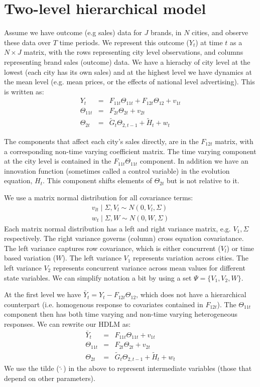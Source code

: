 \documentclass[letter,10pt]{article}
\begin{document}
\section{Two-level hierarchical model}

Assume we have outcome (e.g sales) data for $J$ brands, in $N$ cities, and observe these data
over $T$ time periods.   We represent this outcome ($Y_t$) at time $t$ as a $N\times J$ matrix, 
with the rows representing city level 
observations, and columns representing brand sales (outcome) data.  
We have a hierachy of city level at the lowest (each city has its own sales) and at the
highest level we have dynamics at the mean level (e.g. mean prices, or the effects of national level advertising).  
This is written as:
\begin{eqnarray}
Y_{t} & = & F_{11t} \Theta_{11t} + F_{12t} \Theta_{12} + v_{1t} \\
\Theta_{11t} & = & F_{2t}\Theta_{2t} + v_{2t}  \\
\Theta_{2t} & = & \tilde{G}_t \Theta_{2,t-1} + \tilde{H}_t + w_t 
\end{eqnarray}

The components that affect each city's sales directly, are in the $F_{12t}$ matrix, with a corresponding 
non-time varying coefficient matrix.   The time varying component at the city level is contained in the 
$F_{11t} \Theta_{11t}$ component.  In addition we have an innovation function (sometimes called a control variable) in the 
evolution equation, $H_t$.  This component shifts elements of $\Theta_{2t}$ but is not relative to it.  

We use a matrix normal distribution for all covariance terms:
\begin{eqnarray} 
v_{lt} \mid \Sigma, V_l \sim N(0,V_l,\Sigma)\\
w_{t} \mid \Sigma, W \sim N(0,W,\Sigma)
\end{eqnarray}
Each matrix normal distribution has a left and right variance matrix, e.g. $V_1,\Sigma$ respectively.  
The right variance governs (column) cross equation covariatance.  The left variance captures row covariance, which is either
concurrent ($V_l$) or time based variation ($W$).  The left variance  $V_1$ represents variation across
cities.  The left variance $V_2$ represents concurrent variance across mean values for different state variables.  
We can simplify notation a bit by using a set $\Psi = \{V_1,V_2,W\}$.

At the first level we have $\bar{Y}_t = Y_t - F_{12t} \Theta_{12}$, which does not 
have a hierarchical counterpart (i.e. homogenous response to covariates contained in $F_{12t}$).  
The $\Theta_{11t}$ component then has both time varying and non-time varying 
heterogeneous responses.  
We can rewrite our HDLM as:\begin{eqnarray}
\bar{Y}_{t} & = & F_{11t} \Theta_{11t} + v_{1t} \\
\Theta_{11t} & = & F_{2t}\Theta_{2t} + v_{2t}  \\
\Theta_{2t} & = & \tilde{G}_t \Theta_{2,t-1} + \tilde{H}_t + w_t 
\end{eqnarray}
We use the tilde ($\tilde{\cdot}$) in the above to represent intermediate variables (those that depend on other parameters).  
\end{document}
